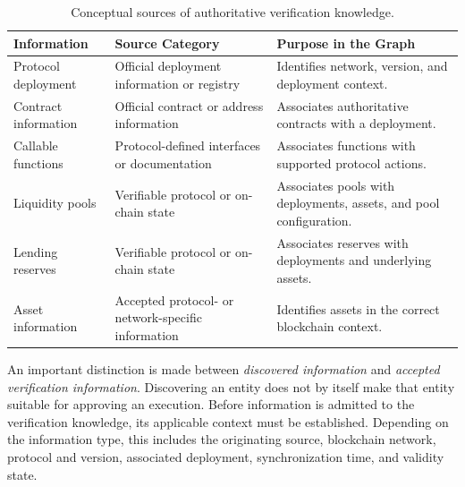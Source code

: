 \begin{table}[H]
\centering
\caption{Conceptual sources of authoritative verification knowledge.}
\label{tab:verification_sources}
\small
\begin{tabular}{p{} p{} p{}}
\hline
\textbf{Information} &
\textbf{Source Category} &
\textbf{Purpose in the Graph} \\
\hline

Protocol deployment &
Official deployment information or registry &
Identifies network, version, and deployment context. \\

Contract information &
Official contract or address information &
Associates authoritative contracts with a deployment. \\

Callable functions &
Protocol-defined interfaces or documentation &
Associates functions with supported protocol actions. \\

Liquidity pools &
Verifiable protocol or on-chain state &
Associates pools with deployments, assets, and pool configuration. \\

Lending reserves &
Verifiable protocol or on-chain state &
Associates reserves with deployments and underlying assets. \\

Asset information &
Accepted protocol- or network-specific information &
Identifies assets in the correct blockchain context. \\

\hline
\end{tabular}
\end{table}

An important distinction is made between \textit{discovered information} and
\textit{accepted verification information}. Discovering an entity does not by
itself make that entity suitable for approving an execution. Before information
is admitted to the verification knowledge, its applicable context must be
established. Depending on the information type, this includes the originating
source, blockchain network, protocol and version, associated deployment,
synchronization time, and validity state.


